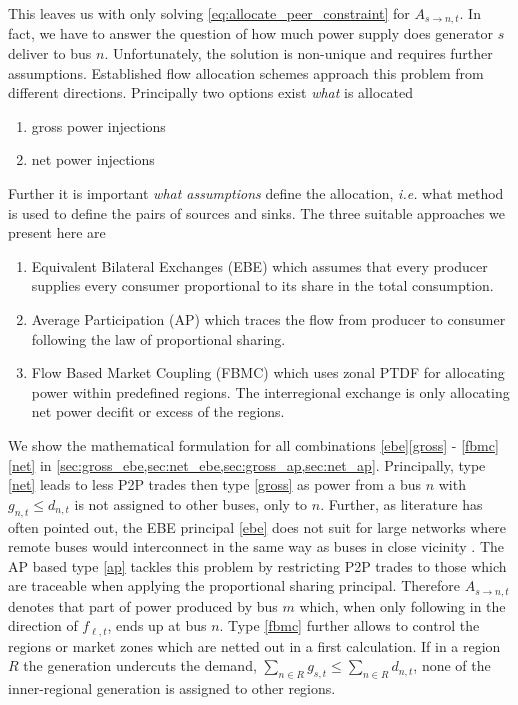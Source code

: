 \documentclass[11pt,twocolumn]{article}
\newcommand{\ie}{\textit{i.e.} }
\newcommand{\generation}{g_{s,t}}
\newcommand{\nodalgeneration}[1][n]{g_{#1,t}}
\newcommand{\demand}[1][n]{d_{#1,t}}
\newcommand{\nodaldemand}[1][n]{d_{#1,t}}
\newcommand{\flow}{f_{\ell,t}}
\newcommand{\allocatepeer}[1][s \rightarrow n]{A_{#1,t}}
\begin{document}
 
This leaves us with only solving \cref{eq:allocate_peer_constraint} for $\allocatepeer$. In fact, we have to answer the question of how much power supply does generator $s$ deliver to bus $n$. Unfortunately, the solution is non-unique and requires further assumptions. Established flow allocation schemes approach this problem from different directions. Principally two options exist \textit{what} is allocated 
% 
\begin{enumerate}
\item gross power injections \label{gross}
\item net power injections \label{net}
\end{enumerate}
% 
Further it is important \textit{what assumptions} define the allocation, \ie what method is used to define the pairs of sources and sinks. The three suitable approaches we present here are
% 
\begin{enumerate}[label=\alph*., ref=\alph*]
\item Equivalent Bilateral Exchanges (EBE) \cite{galiana_transmission_2003} which assumes
that every producer supplies every consumer proportional to its share in the total consumption. \label{ebe} 
\item Average Participation (AP) \cite{bialek_tracing_1996,achayuthakan_electricity_2010-1} which traces the flow from producer to consumer following the law of proportional sharing. \label{ap}
\item Flow Based Market Coupling (FBMC) which uses zonal PTDF for allocating power within predefined regions. The interregional exchange is only allocating net power decifit or excess of the regions. \label{fbmc}
\end{enumerate}
% 
We show the mathematical formulation for all combinations \ref{ebe}\ref{gross} - \ref{fbmc}\ref{net} in \cref{sec:gross_ebe,sec:net_ebe,sec:gross_ap,sec:net_ap}.
% 
Principally, type \ref{net} leads to less P2P trades then type \ref{gross} as power from a bus $n$ with $\nodalgeneration \le \nodaldemand$ is not assigned to other buses, only to $n$. 
Further, as literature has often pointed out, the EBE principal \ref{ebe} does not suit for large networks where remote buses would interconnect in the same way as buses in close vicinity \cite{gil_multiarea_2005}. The AP based type \ref{ap} tackles this problem by restricting P2P trades to those which are traceable when applying the proportional sharing principal. Therefore $\allocatepeer$ denotes that part of power produced by bus $m$ which, when only following in the direction of $\flow$, ends up at bus $n$. Type \ref{fbmc} further allows to control the regions or market zones which are netted out in a first calculation. If in a region $R$ the generation undercuts the demand, $\sum_{n \in R} \generation \le \sum_{n \in R} \demand$, none of the inner-regional generation is assigned to other regions. 
\end{document}
